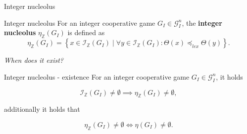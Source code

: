 \documentclass{beamer}
\newcommand{\Z}{\mathbb{Z}}
\begin{document}
\begin{frame}{Integer nucleolus}
    \pause

    \begin{block}{Integer nucleolus}
        \pause
        For an integer cooperative game $G_I \in \mathcal{G}_I^n$, the \textbf{integer nucleolus} $\eta_\Z(G_I)$ is defined as
        \begin{displaymath}
            \eta_{\Z}(G_I) = \left\{ x \in \mathcal{I}_\Z(G_I) \mid \forall y \in \mathcal{I}_\Z(G_I): \Theta(x) \preceq_{lex} \Theta(y)\right\}.
        \end{displaymath}
    \end{block}

    \pause

    \textit{When does it exist?}

    \pause

    \begin{block}{Integer nucleolus - existence}
        \pause
        For an integer cooperative game $G_I \in \mathcal{G}_I^n$, it holds

        \begin{displaymath}
            \mathcal{I}_{\Z}(G_I) \neq \emptyset \implies \eta_\Z(G_I) \neq \emptyset,
        \end{displaymath}

        additionally it holds that

        \begin{displaymath}
            \eta_\Z(G_I) \neq \emptyset \iff \eta(G_I) \neq \emptyset.
        \end{displaymath}
    \end{block}
\end{frame}


\end{document}
